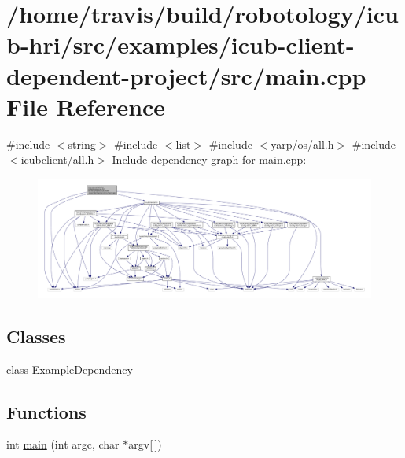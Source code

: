 \hypertarget{examples_2icub-client-dependent-project_2src_2main_8cpp}{}\section{/home/travis/build/robotology/icub-\/hri/src/examples/icub-\/client-\/dependent-\/project/src/main.cpp File Reference}
\label{examples_2icub-client-dependent-project_2src_2main_8cpp}
{\ttfamily \#include $<$string$>$}\newline
{\ttfamily \#include $<$list$>$}\newline
{\ttfamily \#include $<$yarp/os/all.\+h$>$}\newline
{\ttfamily \#include $<$icubclient/all.\+h$>$}\newline
Include dependency graph for main.\+cpp\+:
\nopagebreak
\begin{figure}[H]
\begin{center}
\leavevmode
\includegraphics[width=350pt]{examples_2icub-client-dependent-project_2src_2main_8cpp__incl}
\end{center}
\end{figure}
\subsection*{Classes}
\begin{DoxyCompactItemize}
\item 
class \hyperlink{classExampleDependency}{Example\+Dependency}
\end{DoxyCompactItemize}
\subsection*{Functions}
\begin{DoxyCompactItemize}
\item 
int \hyperlink{examples_2icub-client-dependent-project_2src_2main_8cpp_a0ddf1224851353fc92bfbff6f499fa97}{main} (int argc, char $\ast$argv\mbox{[}$\,$\mbox{]})
\end{DoxyCompactItemize}


